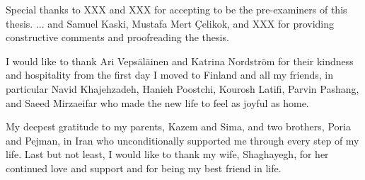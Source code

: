 \documentclass[dissertation,math,vertlayout,pdfa,colorlinks]{aaltoseries}
\begin{document}
\begin{preface}[Espoo]
Special thanks to XXX and XXX for accepting to be the pre-examiners of this thesis. ... %
and Samuel Kaski, Mustafa Mert \c{C}elikok, and XXX for providing constructive comments and proofreading the thesis. 

I would like to thank Ari Vepsäläinen and Katrina Nordström for their kindness and hospitality from the first day I moved to Finland and all my friends, in particular Navid Khajehzadeh, Hanieh Poostchi, Kourosh Latifi, Parvin Pashang, and Saeed Mirzaeifar who made the new life to feel as joyful as home. %

My deepest gratitude to my parents, Kazem and Sima, and two brothers, Poria and Pejman, in Iran who unconditionally supported me through every step of my life. Last but not least, I would like to thank my wife, Shaghayegh, for her continued love and support and for being my best friend in life.

\end{preface}

\clearpage
\tableofcontents


\listofpublications






\end{document}
